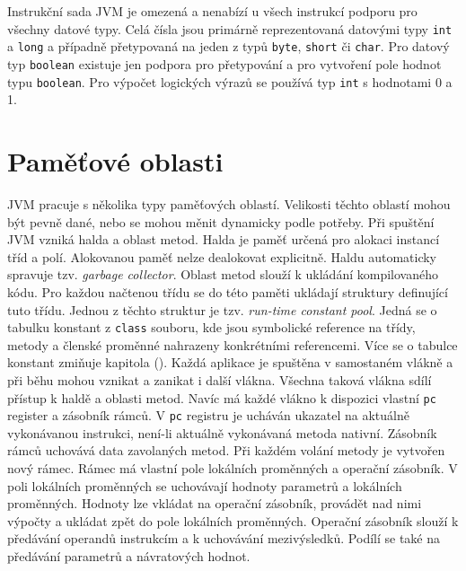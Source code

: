 


Instrukční sada JVM je omezená a nenabízí u všech instrukcí podporu pro všechny datové typy. Celá čísla jsou primárně reprezentovaná datovými typy \texttt{int} a \texttt{long} a případně přetypovaná na jeden z typů \texttt{byte}, \texttt{short} či \texttt{char}. Pro datový typ \texttt{boolean} existuje jen podpora pro přetypování a pro vytvoření pole hodnot typu \texttt{boolean}. Pro výpočet logických výrazů se používá typ \texttt{int} s hodnotami 0 a 1.


\section{Paměťové oblasti}

JVM pracuje s několika typy paměťových oblastí. Velikosti těchto oblastí mohou být pevně dané, nebo se mohou měnit dynamicky podle potřeby. Při spuštění JVM vzniká halda a oblast metod. Halda je paměť určená pro alokaci instancí tříd a polí. Alokovanou paměť nelze dealokovat explicitně. Haldu automaticky spravuje tzv. \textit{garbage collector}. Oblast metod slouží k ukládání kompilovaného kódu. Pro každou načtenou třídu se do této paměti ukládají struktury definující tuto třídu. Jednou z těchto struktur je tzv. \textit{run-time constant pool}. Jedná se o tabulku konstant z \texttt{class} souboru, kde jsou symbolické reference na třídy, metody a členské proměnné nahrazeny konkrétními referencemi. Více se o tabulce konstant zmiňuje kapitola (). Každá aplikace je spuštěna v samostaném vlákně a při běhu mohou vznikat a zanikat i další vlákna. Všechna taková vlákna sdílí přístup k haldě a oblasti metod. Navíc má každé vlákno k dispozici vlastní \texttt{pc} register a zásobník rámců. V \texttt{pc} registru je ucháván ukazatel na aktuálně vykonávanou instrukci, není-li aktuálně vykonávaná metoda nativní. Zásobník rámců uchovává data zavolaných metod. Při každém volání metody je vytvořen nový rámec. Rámec má vlastní pole lokálních proměnných a operační zásobník. V poli lokálních proměnných se uchovávají hodnoty parametrů a lokálních proměnných. Hodnoty lze vkládat na operační zásobník, provádět nad nimi výpočty a ukládat zpět do pole lokálních proměnných. Operační zásobník slouží k předávání operandů instrukcím a k uchovávání mezivýsledků. Podílí se také na předávání parametrů a návratových hodnot.

